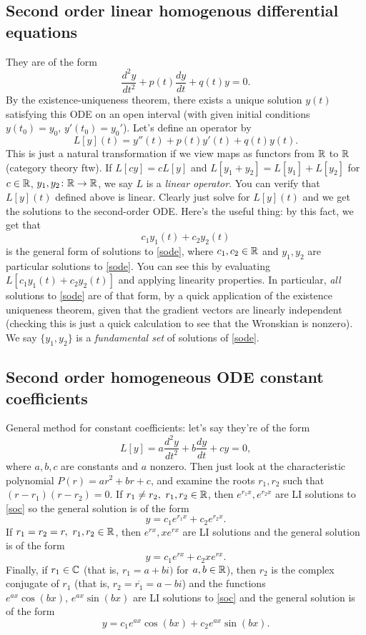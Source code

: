 \subsection{Second order linear homogenous differential equations}
They are of the form 
\begin{equation}\label{sode}
    \frac{d^2y}{dt^2}+p(t)\frac{dy}{dt}+q(t)y=0.
\end{equation}
By the existence-uniqueness theorem, there exists a unique solution $y(t)$ satisfying this ODE on an open interval (with given initial conditions $y(t_0)=y_0,\,y'(t_0)=y_0'$).  Let's define an operator by\[
    L[y](t)=y''(t)+p(t)y'(t)+q(t)y(t).
\] This is just a natural transformation if we view maps as functors from $\mathbb{R}$ to $\mathbb{R}$ (category theory ftw). If $L[cy]=cL[y]$ and $L[y_1+y_2]=L[y_1]+L[y_2]$ for $c\in \mathbb{R}$, $y_1,y_2 \colon \mathbb{R} \to \mathbb{R}$, we say $L$ is a \emph{linear operator}. You can verify that $L[y](t)$ defined above is linear. Clearly just solve for $L[y](t)$ and we get the solutions to the second-order ODE. Here's the useful thing: by this fact, we get that \[
c_1y_1(t)+c_2y_2(t)     
\] is the general form of solutions to \cref{sode}, where $c_1,c_2\in \mathbb{R}$ and $y_1,y_2$ are particular solutions to \cref{sode}. You can see this by evaluating $L[c_1y_1(t)+c_2y_2(t)]$ and applying linearity properties. In particular, \emph{all} solutions to \cref{sode} are of that form, by a quick application of the existence uniqueness theorem, given that the gradient vectors are linearly independent (checking this is just a quick calculation to see that the Wronskian is nonzero). We say $\{y_1,y_2\} $ is a \emph{fundamental set} of solutions of \cref{sode}.
\subsection{Second order homogeneous ODE constant coefficients}
General method for constant coefficients: let's say they're of the form 
\begin{equation}\label{soc}
    L[y]=a \frac{d^2y}{dt^2}+b \frac{dy}{dt}+cy=0,
\end{equation}
where $a,b,c$ are constants and $a$ nonzero. Then just look at the characteristic polynomial $P(r)=ar^2+br+c$, and examine the roots $r_1,r_2$ such that $(r-r_1)(r-r_2)=0$. If $r_1\neq r_2,\ r_1,r_2\in \mathbb{R}$, then $e^{r_1x},e^{r_2x}$ are LI solutions to \cref{soc} so the general solution is of the form \[
y=c_1e^{r_1x}+c_2e^{r_2x}.
\] If $r_1=r_2=r, \ r_1,r_2\in \mathbb{R}$, then $e^{rx},xe^{rx}$ are LI solutions and the general solution is of the form \[
y=c_1e^{rx}+c_2xe^{rx}.
\] Finally, if $r_1\in \mathbb{C}$ (that is, $r_1=a+bi)$ for $a,b\in \mathbb{R}$), then $r_2$ is the complex conjugate of $r_1$ (that is, $r_2=\overline{r_1}=a-bi$) and the functions $e^{ax}\cos(bx),\,e^{ax}\sin(bx)$ are LI solutions to \cref{soc} and the general solution is of the form \[
y=c_1e^{ax}\cos(bx)+c_2e^{ax}\sin(bx).
\] 
